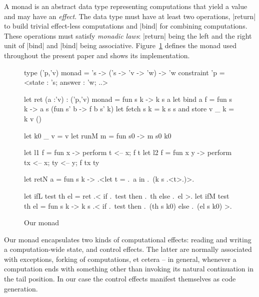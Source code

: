 \documentclass[draft]{elsart}
\begin{document}
A monad \cite{moggi-notions} is an abstract data type representing
computations that yield a value and may have an \emph{effect}.
The data type must have at least two operations, |return| to build
trivial effect-less computations and |bind| for combining
computations. These operations must satisfy \emph{monadic laws}:
|return| being the left and the right unit of |bind| and |bind| being
associative. Figure~\ref{ourmonad} defines the monad used throughout
the present paper and shows its implementation.

\begin{figure}
\begin{code}
type ('p,'v) monad = 's -> ('s -> 'v -> 'w) -> 'w
    constraint 'p = <state : 's; answer : 'w; ..>

let ret (a :'v) : ('p,'v) monad = fun s k -> k s a
let bind a f = fun s k -> a s (fun s' b -> f b s' k)
let fetch s k = k s s  and  store v _ k = k v ()

let k0 _ v = v
let runM m = fun s0 -> m s0 k0 

let l1 f = fun x     -> perform t <-- x; f t
let l2 f = fun x y   -> perform tx <-- x; ty <-- y; f tx ty

let retN a = fun s k -> .<let t = .~a in .~(k s .<t>.)>.

let ifL test th el = ret .< if .~test then .~th else .~el >.
let ifM test th el = fun s k -> 
  k s .< if .~test then .~(th s k0) else .~(el s k0) >.
\end{code}
\caption{Our monad}\label{ourmonad}
\end{figure}

Our monad encapsulates two kinds of computational effects: reading and
writing a computation-wide state, and control effects. The latter are
normally associated with exceptions, forking of computations, et
cetera --
in general, whenever a computation ends with something other than
invoking its natural continuation in the tail position. In our case
the control effects manifest themselves as code generation.
\end{document}
